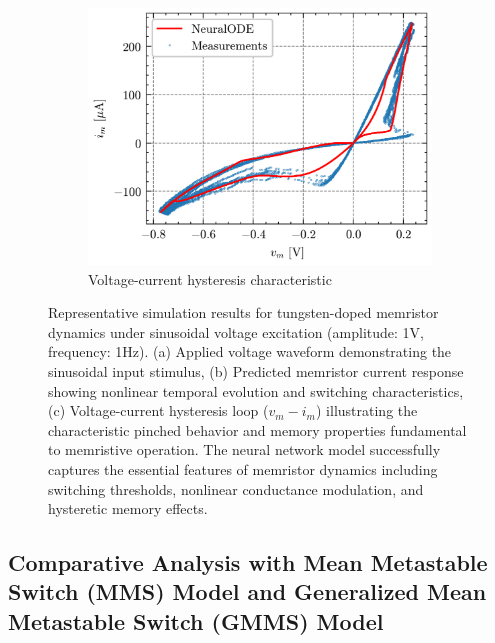 \documentclass[11pt, oneside]{article}
\begin{document}
\begin{figure}[H]
\begin{subfigure}[b]{\subwidth}
        \includegraphics[width=\linewidth]{sample_results/hysteresis.png}
        \caption{Voltage-current hysteresis characteristic}
    \end{subfigure}
    \caption{Representative simulation results for tungsten-doped memristor dynamics under sinusoidal voltage excitation (amplitude: 1V, frequency: 1Hz). (a) Applied voltage waveform demonstrating the sinusoidal input stimulus, (b) Predicted memristor current response showing nonlinear temporal evolution and switching characteristics, (c) Voltage-current hysteresis loop (\(v_m - i_m\)) illustrating the characteristic pinched behavior and memory properties fundamental to memristive operation. The neural network model successfully captures the essential features of memristor dynamics including switching thresholds, nonlinear conductance modulation, and hysteretic memory effects.}
    \label{fig:sample-results}
\end{figure}



\clearpage

\subsection{Comparative Analysis with Mean Metastable Switch (MMS) Model and Generalized Mean Metastable Switch (GMMS) Model}
\end{document}
